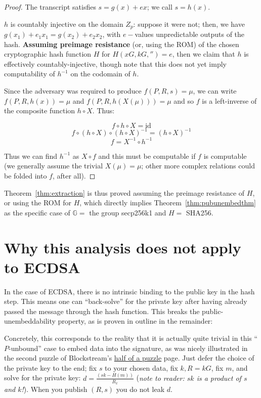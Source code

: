 \documentclass[10pt,a4paper]{article}
\theoremstyle{definition}   %
\theoremstyle{remark}       %
\newcommand{\G}{\mathbb{G}}
\begin{document}
\begin{proof}
The transcript satisfies $s=g(x)+ex$; we call $s = h(x)$.

$h$ is countably injective on the domain $Z_p$: suppose it were not; then, we have $g(x_1) + e_1x_1 = g(x_2) + e_2 x_2$, with $e-$values unpredictable outputs of the hash. \textbf{Assuming preimage resistance} (or, using the ROM) of the chosen cryptographic hash function $H$ for $H(xG, kG, '')=e$, then we claim that $h$ is effectively countably-injective, though note that this does not yet imply computability of $h^{-1}$ on the codomain of $h$.

\vskip 0.1in

Since the adversary was required to produce $f(P, R, s) =  \mu$, we can write $f(P, R, h(x)) = \mu$ and $f(P, R, h(X(\mu))) = \mu$ and so $f$ is a left-inverse of the composite function $h \circ X$. Thus:

\[ f \circ h \circ X = \textrm{id}
\]
\[ f \circ \left(h \circ X\right) \circ \left(h \circ X\right)^{-1} =  \left(h \circ X \right)^{-1}
\]
\[ f = X^{-1} \circ h^{-1}
\]

Thus we can find $h^{-1}$ as $X \circ f$ and this must be computable if $f$ is computable (we generally assume the trivial $X(\mu) = \mu$; other more complex relations could be folded into $f$, after all).
\end{proof}
\vskip 0.2in
Theorem~\ref{thm:extraction} is thus proved assuming the preimage resistance of $H$, or using the ROM for $H$, which directly implies Theorem~\ref{thm:pubunembedthm} as the specific case of $\G =$ the group secp256k1 and $H =$ SHA256.




\section{Why this analysis does not apply to ECDSA}

In the case of ECDSA, there is no intrinsic binding to the public key in the hash step. This means one can ``back-solve'' for the private key after having already passed the message through the hash function. This breaks the public-unembeddability property, as is proven in outline in the remainder:

\vskip 0.2in

Concretely, this corresponds to the reality that it is actually quite trivial in this ``$P$-unbound'' case to embed data into the signature, as was nicely illustrated in the second puzzle of Blockstream's \href{https://blockstream.com/puzzle/}{half of a puzzle} page. Just defer the choice of the private key to the end; fix $s$ to your chosen data, fix $k, R=kG$, fix $m$, and solve for the private key: $d = \frac{(sk - H(m))}{R_x}$ (\emph{note to reader: $sk$ is a product of $s$ and $k$!}). When you publish $(R, s)$ you do not leak $d$.
\end{document}
